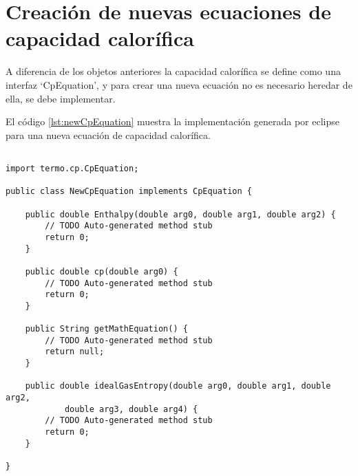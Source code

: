 \section{Creación de nuevas ecuaciones de capacidad calorífica}\label{sec:newCpEquation}

	A diferencia de los objetos anteriores la capacidad calorífica se define como una interfaz `CpEquation', y para crear una nueva ecuación no es necesario heredar de ella, se debe implementar.


	El código \ref{lst:newCpEquation} muestra la implementación generada por eclipse para una nueva ecuación de capacidad calorífica.

	\begin{lstlisting}[caption={Esqueleto para crear una nueva ecuación de capacidad calorífica}, label={lst:newCpEquation}]

import termo.cp.CpEquation;

public class NewCpEquation implements CpEquation {

	public double Enthalpy(double arg0, double arg1, double arg2) {
		// TODO Auto-generated method stub
		return 0;
	}

	public double cp(double arg0) {
		// TODO Auto-generated method stub
		return 0;
	}

	public String getMathEquation() {
		// TODO Auto-generated method stub
		return null;
	}

	public double idealGasEntropy(double arg0, double arg1, double arg2,
			double arg3, double arg4) {
		// TODO Auto-generated method stub
		return 0;
	}

}
	\end{lstlisting}

